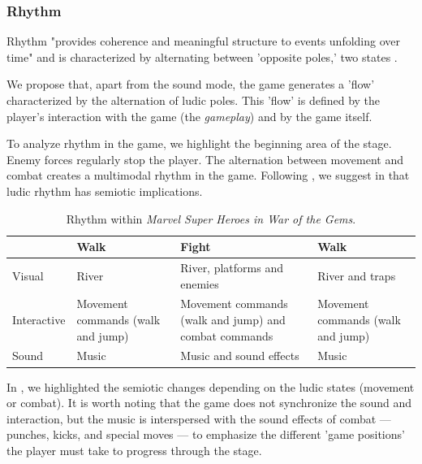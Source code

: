 \documentclass[english]{textolivre}
\begin{document}
\subsubsection{Rhythm}\label{sec-idioma}
Rhythm "provides coherence and meaningful structure to events unfolding over time" \cite[p. 179]{van_leeuwen_introducing_2005} and is characterized by alternating between 'opposite poles,' two states \cite[p. 182]{van_leeuwen_introducing_2005}.

We propose that, apart from the sound mode, the game generates a 'flow' characterized by the alternation of ludic poles. This 'flow' is defined by the player's interaction with the game (the \textit{gameplay}) and by the game itself.

To analyze rhythm in the game, we highlight the beginning area of the stage. Enemy forces regularly stop the player. The alternation between movement and combat creates a multimodal rhythm in the game. Following \textcite[p. 187-8]{van_leeuwen_introducing_2005}, we suggest in  that ludic rhythm has semiotic implications.

\begin{table}[htbp]
\begin{threeparttable}
\caption{Rhythm within \textit{Marvel Super Heroes in War of the Gems}.}
\label{tbl01}
\centering
\begin{tabular}{p{}p{}p{}p{}}
& Walk & Fight & Walk \\
\hline
Visual & River & River, platforms and enemies & River and traps \\
Interactive & Movement commands (walk and jump) & Movement commands (walk and jump) and combat commands & Movement commands (walk and jump) \\
Sound & Music & Music and sound effects & Music \\
\hline
\end{tabular}
\end{threeparttable}
\end{table}

In , we highlighted the semiotic changes depending on the ludic states (movement or combat). It is worth noting that the game does not synchronize the sound and interaction, but the music is interspersed with the sound effects of combat — punches, kicks, and special moves — to emphasize the different 'game positions' the player must take to progress through the stage.
\end{document}
